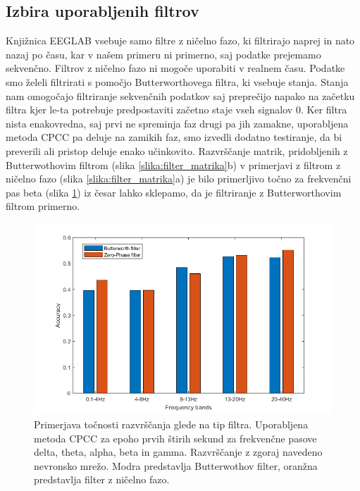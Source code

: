 \newpage
\subsection{Izbira uporabljenih filtrov}
Knjižnica EEGLAB vsebuje samo filtre z ničelno fazo, ki filtrirajo naprej in nato nazaj po času, kar v našem primeru ni primerno, saj podatke prejemamo sekvenčno. Filtrov z ničelno fazo ni mogoče uporabiti v realnem času. Podatke smo želeli filtrirati s pomočjo Butterworthovega filtra, ki vsebuje stanja. Stanja nam omogočajo filtriranje sekvenčnih podatkov saj preprečijo napako na začetku filtra kjer le-ta potrebuje predpostaviti začetno staje vseh signalov 0. Ker filtra nista enakovredna, saj prvi ne spreminja faz drugi pa jih zamakne, uporabljena metoda CPCC pa deluje na zamikih faz, smo izvedli dodatno testiranje, da bi preverili ali pristop deluje enako učinkovito. Razvrščanje matrik, pridobljenih z Butterwothovim filtrom (slika \ref{slika:filter_matrika}b) v primerjavi z filtrom z ničelno fazo (slika \ref{slika:filter_matrika}a) je bilo primerljivo točno za frekvenčni pas beta (slika \ref{slika:primerjava_filtrov}) iz česar lahko sklepamo, da je filtriranje z Butterworthovim filtrom primerno.
\begin{figure}
    \begin{center}
    \includegraphics[width=1 \linewidth]{slike/ComparisonFilters.png}
    \end{center}
    \caption[Točnost razvrščanja glede na tip filtra in frekvenčno območje.]{Primerjava točnosti razvrščanja glede na tip filtra. Uporabljena metoda CPCC za epoho prvih štirih sekund za frekvenčne pasove delta, theta, alpha, beta in gamma. Razvrščanje z zgoraj navedeno nevronsko mrežo. Modra predstavlja Butterwothov filter, oranžna predstavlja filter z ničelno fazo.}
    \label{slika:primerjava_filtrov}
\end{figure}

